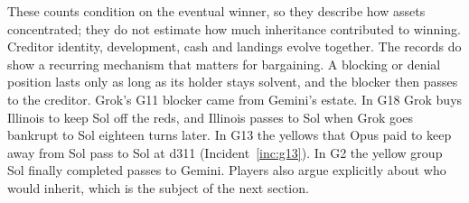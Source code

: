 These counts condition on the eventual winner, so they describe how assets concentrated; they do not estimate how much inheritance contributed to winning. Creditor identity, development, cash and landings evolve together. The records do show a recurring mechanism that matters for bargaining. A blocking or denial position lasts only as long as its holder stays solvent, and the blocker then passes to the creditor. Grok's G11 blocker came from Gemini's estate. In G18 Grok buys Illinois to keep Sol off the reds, and Illinois passes to Sol when Grok goes bankrupt to Sol eighteen turns later. In G13 the yellows that Opus paid to keep away from Sol pass to Sol at d311 (Incident~\ref{inc:g13}). In G2 the yellow group Sol finally completed passes to Gemini. Players also argue explicitly about who would inherit, which is the subject of the next section.

\FloatBarrier
